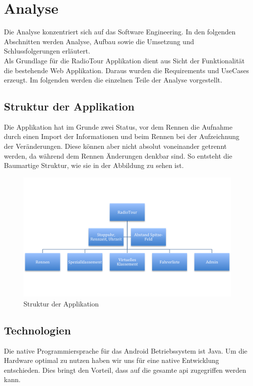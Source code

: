 \chapter{Analyse}
Die Analyse konzentriert sich auf das Software Engineering. In den folgenden Abschnitten werden Analyse, Aufbau sowie die Umsetzung und Schlussfolgerungen erläutert.
\\

Als Grundlage für die RadioTour Applikation dient aus Sicht der Funktionalität die bestehende Web Applikation. Daraus wurden die Requirements und UseCases erzeugt. Im folgenden werden die einzelnen Teile der Analyse vorgestellt.

\section{Struktur der Applikation}
Die Applikation hat im Grunde zwei Status, vor dem Rennen die Aufnahme durch einen Import der Informationen und beim Rennen bei der Aufzeichnung der Veränderungen. Diese können aber nicht absolut voneinander getrennt werden, da während dem Rennen Änderungen denkbar sind. So entsteht die Baumartige Struktur, wie sie in der Abbildung zu sehen ist.

\begin{figure}[h!]
\caption{Struktur der Applikation}
\centering
\includegraphics{05technischerbericht/images/struktur.png}
\end{figure} 


\section{Technologien}
Die native Programmiersprache für das Android Betriebssystem ist Java. Um die Hardware optimal zu nutzen haben wir uns für eine native Entwicklung entschieden. Dies bringt den Vorteil, dass auf die gesamte \gls{api} zugegriffen werden kann.

